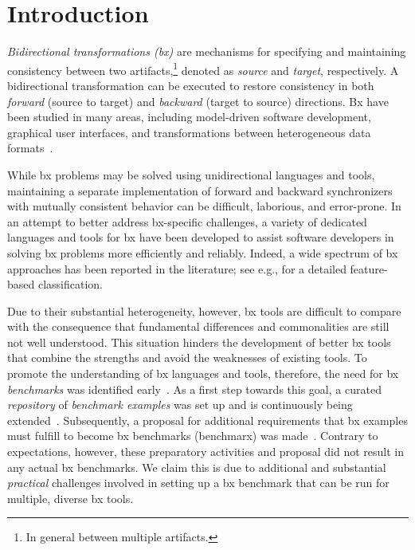 \section{Introduction}
\label{sec:Introduction}
%

\emph{Bidirectional transformations (bx)} are mechanisms for specifying and maintaining consistency between two artifacts,\footnote{In general between multiple artifacts.} denoted as \emph{source} and \emph{target}, respectively. 
A bidirectional transformation can be executed to restore consistency in both \emph{forward} (source to target) and \emph{backward} (target to source) directions. 
Bx have been studied in many areas, including model-driven software development, graphical user interfaces, and transformations between heterogeneous data formats~\cite{ICMT2009-Czarnecki}.

While bx problems may be solved using unidirectional languages and tools, maintaining a separate implementation of forward and backward synchronizers with mutually consistent behavior can be difficult, laborious, and error-prone. 
In an attempt to better address bx-specific challenges, a variety of dedicated languages and tools for bx have been developed to assist software developers in solving bx problems more efficiently and reliably. 
Indeed, a wide spectrum of bx approaches has been reported in the literature; see e.g., \cite{SOSYM-Hidaka2016} for a detailed feature-based classification.

Due to their substantial heterogeneity, however, bx tools are difficult to compare with the consequence that fundamental differences and commonalities are still not well understood.
This situation hinders the development of better bx tools that combine the strengths and avoid the weaknesses of existing tools.
To promote the understanding of bx languages and tools, therefore, the need for bx \emph{benchmarks} was identified early~\cite{ICMT2009-Czarnecki}. 
As a first step towards this goal, a curated \emph{repository} of \emph{benchmark examples} was set up and is continuously being extended~\cite{Cheney2014}.
Subsequently, a proposal for additional requirements that bx examples must fulfill to become bx benchmarks (benchmarx) was made~\cite{AnjorinCG0RS14}. 
Contrary to expectations, however, these preparatory activities and proposal did not result in any actual bx benchmarks.
We claim this is due to additional and substantial \emph{practical} challenges involved in setting up a bx benchmark that can be run for multiple, diverse bx tools.

